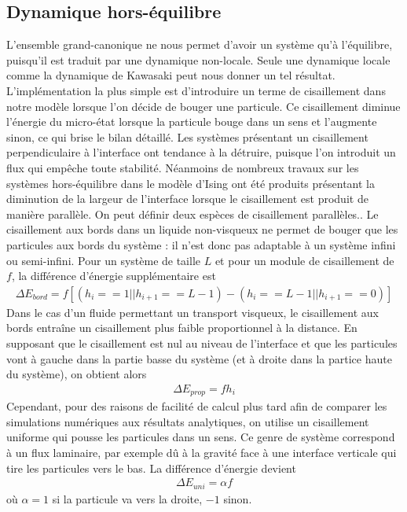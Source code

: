 	\subsection{Dynamique hors-équilibre}
L'ensemble grand-canonique ne nous permet d'avoir un système qu'à l'équilibre, puisqu'il est traduit par une dynamique non-locale. Seule une dynamique locale comme la dynamique de Kawasaki peut nous donner un tel résultat. L'implémentation la plus simple est d'introduire un terme de cisaillement dans notre modèle lorsque l'on décide de bouger une particule. Ce cisaillement diminue l'énergie du micro-état lorsque la particule bouge dans un sens et l'augmente sinon, ce qui brise le bilan détaillé. Les systèmes présentant un cisaillement perpendiculaire à l'interface ont tendance à la détruire, puisque l'on introduit un flux qui empêche toute stabilité\cite{}. Néanmoins de nombreux travaux sur les systèmes hors-équilibre dans le modèle d'Ising ont été produits \cite{smith_interfaces_2008} présentant la diminution de la largeur de l'interface lorsque le cisaillement est produit de manière parallèle. 
On peut définir deux espèces de cisaillement parallèles.. 
Le cisaillement aux bords dans un liquide non-visqueux ne permet de bouger que les particules aux bords du système : il n'est donc pas adaptable à un système infini ou semi-infini. Pour un système de taille $L$ et pour un module de cisaillement de $f$, la différence d'énergie supplémentaire est 
\begin{align}
	\Delta E_{bord} = f [ (h_i == 1 || h_{i+1} == L-1) - (h_i == L-1 || h_{i+1} == 0)  ]
\end{align}
Dans le cas d'un fluide permettant un transport visqueux, le cisaillement aux bords entraîne un cisaillement plus faible proportionnel à la distance\cite{}. En supposant que le cisaillement est nul au niveau de l'interface et que les particules vont à gauche dans la partie basse du système (et à droite dans la partice haute du système), on obtient alors
\begin{align}
	\Delta E_{prop} = f h_i
\end{align}
Cependant, pour des raisons de facilité de calcul plus tard afin de comparer les simulations numériques aux résultats analytiques, on utilise un cisaillement uniforme qui pousse les particules dans un sens. Ce genre de système correspond à un flux laminaire, par exemple dû à la gravité face à une interface verticale qui tire les particules vers le bas\cite{}. La différence d'énergie devient
\begin{align}
	\Delta E_{uni} = \alpha f
\end{align}
où $\alpha = 1$ si la particule va vers la droite, $-1$ sinon. 
		
